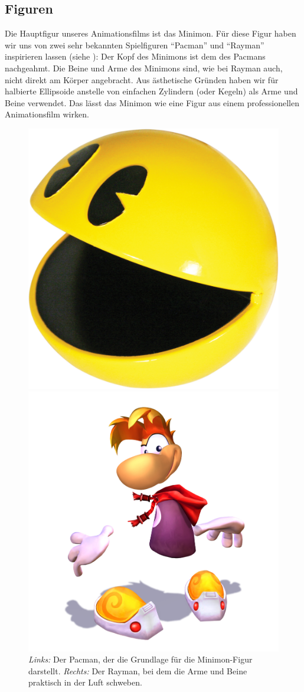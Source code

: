 \subsection{Figuren}

Die Hauptfigur unseres Animationsfilms ist das Minimon. Für diese Figur haben wir uns von zwei sehr bekannten Spielfiguren ``Pacman'' und ``Rayman'' inspirieren lassen (siehe ): Der Kopf des Minimons ist dem des Pacmans nachgeahmt. Die Beine und Arme des Minimons sind, wie bei Rayman auch, nicht direkt am Körper angebracht. Aus ästhetische Gründen haben wir für halbierte Ellipsoide anstelle von einfachen Zylindern (oder Kegeln) als Arme und Beine verwendet. Das lässt das Minimon wie eine Figur aus einem professionellen Animationsfilm wirken.

\begin{figure} [h]
	\begin{minipage}{0.45\textwidth}
		\centering
		\includegraphics[width=0.5\linewidth]{Documentation/Images/Pacman.jpg}
	\end{minipage}
	\hfill
	\begin{minipage}{0.45\textwidth}
		\centering
		\includegraphics[width=0.5\linewidth]{Documentation/Images/Rayman.jpg}
	\end{minipage}
	\caption{\textit{Links:} Der Pacman, der die Grundlage für die Minimon-Figur darstellt. \textit{Rechts:} Der Rayman, bei dem die Arme und Beine praktisch in der Luft schweben.}
	\label{fig:character_design}
\end{figure}


